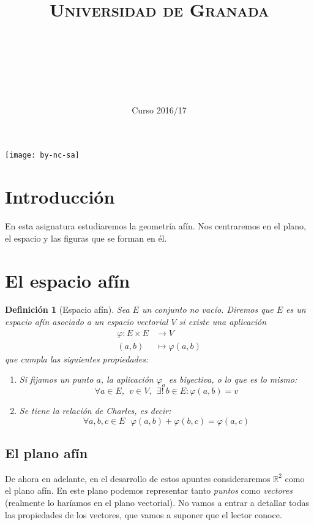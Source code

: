 \documentclass[11pt, a4paper]{article}
\title{
  \normalfont \normalsize
  \textsc{Universidad de Granada} \\ [25pt]    %
  \horrule{0.5pt} \\[0.4cm] %
  \huge \sffamily\subject\\ %
  \horrule{2pt} \\[0.5cm] %
}
\author{\Large\sffamily{\docauthor}}
\date{\vspace{-1.5em} \normalsize \sffamily Curso 2016/17}
\newif\IfInSansMode
\newcommand{\R}{\mathbb{R}}
\theoremstyle{theorem-style}
\theoremstyle{definition-style}
\newtheorem{ndef}{Definición}[section]
\theoremstyle{remark-style}
\theoremstyle{example-style}
\newenvironment{nlist}
{\begin{enumerate}
    \renewcommand\labelenumi{(\emph{\roman{enumi})}}}
  {\end{enumerate}}
\begin{document}

\newpage
\hfill
\newpage

\tableofcontents    %
\vfill
\begin{center}
  \texttt{[image: by-nc-sa]}  %
\end{center}
\newpage


\section*{Introducción}
En esta asignatura estudiaremos la geometría afín. Nos centraremos en el plano, el espacio y las figuras que se forman en él.
\newpage

\section{El espacio afín}
\begin{ndef}[Espacio afín]
  Sea $E$ un conjunto no vacío. Diremos que $E$ es un \textit{espacio afín} asociado a un espacio vectorial $V$ si existe una aplicación
  \begin{align*}
    \varphi: E \times E & \rightarrow V \\
    (a,b) & \mapsto \varphi(a,b)
  \end{align*}
  que cumpla las siguientes propiedades:
  \begin{nlist}
  \item Si fijamos un punto $a$, la aplicación $\varphi_a$ es biyectiva, o lo que es lo mismo:
    $$\forall a \in E, \ \ v \in V, \ \ \exists! \ b \in E:\varphi(a,b)=v$$
  \item Se tiene la relación de Charles, es decir:
    $$\forall a, b, c \in E \ \ \  \varphi(a,b) + \varphi(b,c) = \varphi(a,c)$$
  \end{nlist}
\end{ndef}
\subsection{El plano afín}

De ahora en adelante, en el desarrollo de estos apuntes consideraremos $\R^2$ como el plano afín. En este plano podemos representar tanto \textit{puntos} como \textit{vectores} (realmente lo haríamos en el plano vectorial). No vamos a entrar a detallar todas las propiedades de los vectores, que vamos a suponer que el lector conoce. \\
\end{document}

